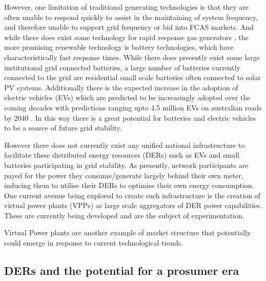 However, one limitation of traditional generating technologies is that they are often unable to respond quickly to assist in the maintaining of system frequency, and therefore unable to support grid frequency or bid into FCAS markets.
And while there does exist some technology for rapid response gas generators \cite{GONZALEZSALAZAR20181497}, the more promising renewable technology is battery technologies, which have characteristically fast response times.
While there does presently exist some large institutional grid connected batteries, a large number of batteries currently connected to the grid are residential small scale batteries often connected to solar PV systems.
Additionally there is the expected increase in the adoption of electric vehicles (EVs) which are predicted to be increasingly adopted over the coming decades with predictions ranging upto 4.5 million EVs on australian roads by 2040 \cite{australianenergymarketoperatorlimited2019}.
In this way there is a great potential for batteries and electric vehicles to be a source of future grid stability.

However there does not currently exist any unified national infrastructure to facilitate these distributed energy resources (DERs) such as EVs and small batteries participating in grid stability.
As presently, network participants are payed for the power they consume/generate largely behind their own meter, inducing them to utilise their DERs to optimise their own energy consumption.
One current avenue being explored to create such infrastructure is the creation of virtual power plants (VPPs) as large scale aggregators of DER power capabilities. These are currently being developed and are the subject of experimentation. \cite{australianenergymarketoperatorlimited20188}


Virtual Power plants are another example of market structure that potentially could emerge in response to current technological trends.

\subsection{DERs and the potential for a prosumer era}

